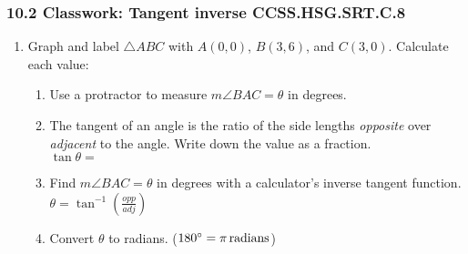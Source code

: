 \documentclass[12pt, twoside]{article}
\begin{document}
\subsubsection*{10.2 Classwork: Tangent inverse \hfill CCSS.HSG.SRT.C.8}
\begin{enumerate}
\item Graph and label $\triangle ABC$ with $A(0,0)$, $B(3,6)$, and $C(3,0)$. Calculate each value:
  \begin{enumerate}[itemsep=1.25cm]  
    \item Use a protractor to measure $m\angle BAC= \theta$ in degrees.
    \item The tangent of an angle is the ratio of the side lengths \emph{opposite} over \emph{adjacent} to the angle. Write down the value as a fraction.\\[0.5cm]
      $\tan  \theta=$
    \item Find $m\angle BAC=\theta$ in degrees with a calculator's inverse tangent function.\\ $\displaystyle \theta = \tan^{-1}(\frac{opp}{adj})$
    \item Convert $ \theta$ to radians. ($180^\circ=\pi \, \rm{radians}$)
  \end{enumerate}

\newpage

\end{enumerate}
\end{document}
